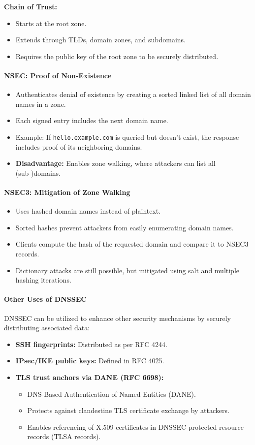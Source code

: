 \textbf{Chain of Trust:}
\begin{itemize}
    \item Starts at the root zone.
    \item Extends through TLDs, domain zones, and subdomains.
    \item Requires the public key of the root zone to be securely distributed.
\end{itemize}
\paragraph{NSEC: Proof of Non-Existence}
\begin{itemize}
    \item Authenticates denial of existence by creating a sorted linked list of all domain names in a zone.
    \item Each signed entry includes the next domain name.
    \item Example: If \texttt{hello.example.com} is queried but doesn't exist, the response includes proof of its neighboring domains.
    \item \textbf{Disadvantage:} Enables zone walking, where attackers can list all (sub-)domains.
\end{itemize}
\paragraph{NSEC3: Mitigation of Zone Walking}
\begin{itemize}
    \item Uses hashed domain names instead of plaintext.
    \item Sorted hashes prevent attackers from easily enumerating domain names.
    \item Clients compute the hash of the requested domain and compare it to NSEC3 records.
    \item Dictionary attacks are still possible, but mitigated using salt and multiple hashing iterations.
\end{itemize}
\paragraph{Other Uses of DNSSEC}
DNSSEC can be utilized to enhance other security mechanisms by securely distributing associated data:
\begin{itemize}
    \item \textbf{SSH fingerprints:} Distributed as per RFC 4244.
    \item \textbf{IPsec/IKE public keys:} Defined in RFC 4025.
    \item \textbf{TLS trust anchors via DANE (RFC 6698):}
    \begin{itemize}
        \item DNS-Based Authentication of Named Entities (DANE).
        \item Protects against clandestine TLS certificate exchange by attackers.
        \item Enables referencing of X.509 certificates in DNSSEC-protected resource records (TLSA records).
    \end{itemize}
\end{itemize}
